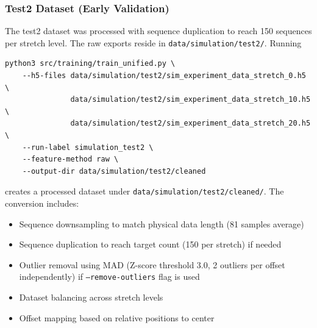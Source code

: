 \documentclass[11pt,a4paper]{article}
\begin{document}
\subsubsection{Test2 Dataset (Early Validation)}
The test2 dataset was processed with sequence duplication to reach 150 sequences per stretch level.
The raw exports reside in \texttt{data/simulation/test2/}. Running
\begin{verbatim}
python3 src/training/train_unified.py \
    --h5-files data/simulation/test2/sim_experiment_data_stretch_0.h5 \
               data/simulation/test2/sim_experiment_data_stretch_10.h5 \
               data/simulation/test2/sim_experiment_data_stretch_20.h5 \
    --run-label simulation_test2 \
    --feature-method raw \
    --output-dir data/simulation/test2/cleaned
\end{verbatim}
creates a processed dataset under \texttt{data/simulation/test2/cleaned/}. The conversion includes:
\begin{itemize}[leftmargin=1.5em]
    \item Sequence downsampling to match physical data length (81 samples average)
    \item Sequence duplication to reach target count (150 per stretch) if needed
    \item Outlier removal using MAD (Z-score threshold 3.0, 2 outliers per offset independently) if \texttt{--remove-outliers} flag is used
    \item Dataset balancing across stretch levels
    \item Offset mapping based on relative positions to center
\end{itemize}
\end{document}
